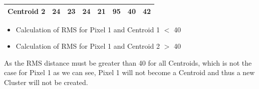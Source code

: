 \documentclass{article}
\begin{document}
{\begin{table}[h]
{\begin{tabular}{|p{2cm}|p{3cm}|p{3cm}|p{3cm}|p{3cm}|p{3cm}|p{3cm}|p{3cm}|}
                        \centering Centroid 2 &  \hspace*{1.2cm} 24 &  \hspace*{1.2cm} 23 &  \hspace*{1.2cm} 24 &  \hspace*{1.2cm} 21 &  \hspace*{1.1cm} 95 &  \hspace*{1.1cm} 40 &  \hspace*{1.1cm} 42  \\
                        \hline
                       \end{tabular}}
                    \end{table}
                    \begin{itemize}
                        \item Calculation of RMS for Pixel 1 and Centroid 1 $<$ 40
                        \item Calculation of RMS for Pixel 1 and Centroid 2 $>$ 40
                    \end{itemize}
                    
                    As the RMS distance must be greater than 40 for all Centroids, which is not the case for Pixel 1 as we can see, Pixel 1 will not become a Centroid and thus a new Cluster will not be created.
                    \vspace*{3\baselineskip}
                    
                    \begin{table}[h]
                      \centering
                      \caption{Centroids \& Pixel 2 values}
                      \vspace*{2\baselineskip}
                      \label{tab:result-table}
                      \renewcommand{\arraystretch}{2.5} %
\end{table}}
\end{document}
